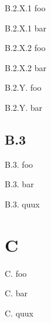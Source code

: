 \documentclass[11pt]{article}
\begin{document}

    B.2.X.1 foo

    B.2.X.1 bar


    B.2.X.2 foo

    B.2.X.2 bar


    B.2.Y. foo

    B.2.Y. bar

    \subsection{B.3}

    B.3. foo

    B.3. bar

    B.3. quux

    \section{C}

    C. foo

    C. bar

    C. quux
\end{document}
